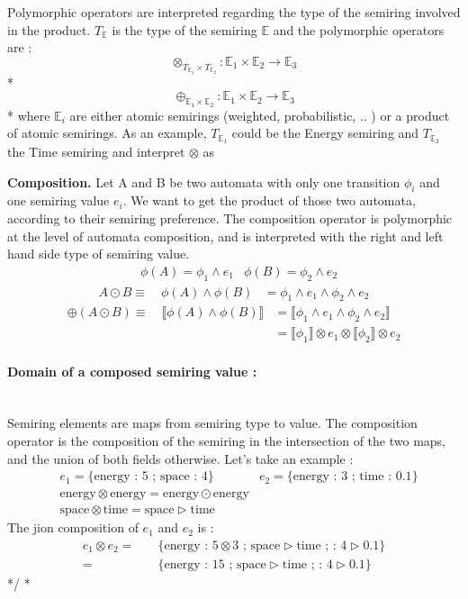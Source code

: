 \documentclass{article}
\theoremstyle{plain}
\theoremstyle{definition}
\begin{document}
Polymorphic operators are interpreted regarding the type of the semiring involved in the product. $T_{\mathbb{E}}$ is the type of the semiring $\mathbb{E}$ and the polymorphic operators are : 
$$\otimes_{T_{\mathbb{E}_1} \times T_{\mathbb{E}_2}} : \mathbb{E}_1 \times \mathbb{E}_2 \to \mathbb{E}_3$$ 
\/*
$$\oplus_{\mathbb{E}_1 \times \mathbb{E}_2} : \mathbb{E}_1 \times \mathbb{E}_2 \to \mathbb{E}_3$$ 
\/*
where $\mathbb{E}_i$ are either atomic semirings (weighted, probabilistic, .. ) or a product of atomic semirings. As an example, $T_{\mathbb{E}_1}$ could be the Energy semiring and $ T_{\mathbb{E}_2}$ the Time semiring and interpret $\otimes$ as

\textbf{Composition.} Let A and B be two automata with only one transition $\phi_i$ and one semiring value $e_i$. We want to get the product of those two automata, according to their semiring preference. The composition operator is polymorphic at the level of automata composition, and is interpreted with the right and left hand side type of semiring value. 
\begin{align*}
& \phi(A) =   \phi_1 \land e_1 
& \phi(B) =   \phi_2 \land e_2
\end{align*}
\begin{align*}
A \odot B \equiv \quad \phi(A) \land \phi(B) & = \phi_1 \land e_1 \land \phi_2 \land e_2
\end{align*}
\begin{align*}
\oplus (A \odot B) \equiv \quad \llbracket \phi(A) \land \phi(B) \rrbracket  & = \llbracket \phi_1 \land e_1 \land \phi_2\land e_2 \rrbracket \\
& = \llbracket \phi_1 \rrbracket \otimes e_1 \otimes \llbracket \phi_2 \rrbracket \otimes e_2 
\end{align*}

\paragraph{Domain of a composed semiring value :} \hspace{0pt} \\
Semiring elements are maps from semiring type to value. The composition operator is the composition of the semiring in the intersection of the two maps, and the union of both fields otherwise. Let's take an example :
\begin{align*}
& e_1 =   \{\text{energy : 5 ; space : 4}\} 
& e_2 =   \{\text{energy : 3 ; time : 0.1}\} \\
& \text{energy} \otimes \text{energy} = \text{energy} \odot \text{energy} \\
& \text{space} \otimes \text{time} = \text{space} \triangleright \text{time} 
\end{align*}
The jion composition of $e_1$ and $e_2$ is :
\begin{align*}
 e_1 \otimes e_2 = \quad  & \{\text{energy : } 5 \otimes 3 \text{ ; space}\triangleright \text{time ;  : 4} \triangleright \text{0.1}\} \\
 		= \quad & \{\text{energy : } 15 \text{ ; space}\triangleright \text{time ;  : 4} \triangleright \text{0.1}\}
\end{align*}
*/
\/*
\end{document}
